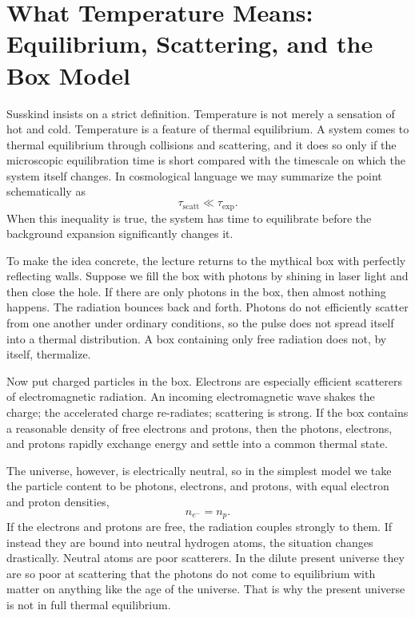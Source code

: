 \section{What Temperature Means: Equilibrium, Scattering, and the Box Model}

Susskind insists on a strict definition. Temperature is not merely a sensation of hot and cold. Temperature is a feature of thermal equilibrium. A system comes to thermal equilibrium through collisions and scattering, and it does so only if the microscopic equilibration time is short compared with the timescale on which the system itself changes. In cosmological language we may summarize the point schematically as
\begin{equation}
\tau_{\mathrm{scatt}} \ll \tau_{\mathrm{exp}}.
\end{equation}
When this inequality is true, the system has time to equilibrate before the background expansion significantly changes it.

To make the idea concrete, the lecture returns to the mythical box with perfectly reflecting walls. Suppose we fill the box with photons by shining in laser light and then close the hole. If there are only photons in the box, then almost nothing happens. The radiation bounces back and forth. Photons do not efficiently scatter from one another under ordinary conditions, so the pulse does not spread itself into a thermal distribution. A box containing only free radiation does not, by itself, thermalize.

Now put charged particles in the box. Electrons are especially efficient scatterers of electromagnetic radiation. An incoming electromagnetic wave shakes the charge; the accelerated charge re-radiates; scattering is strong. If the box contains a reasonable density of free electrons and protons, then the photons, electrons, and protons rapidly exchange energy and settle into a common thermal state.

The universe, however, is electrically neutral, so in the simplest model we take the particle content to be photons, electrons, and protons, with equal electron and proton densities,
\begin{equation}
n_{e^-} = n_p.
\end{equation}
If the electrons and protons are free, the radiation couples strongly to them. If instead they are bound into neutral hydrogen atoms, the situation changes drastically. Neutral atoms are poor scatterers. In the dilute present universe they are so poor at scattering that the photons do not come to equilibrium with matter on anything like the age of the universe. That is why the present universe is not in full thermal equilibrium.

